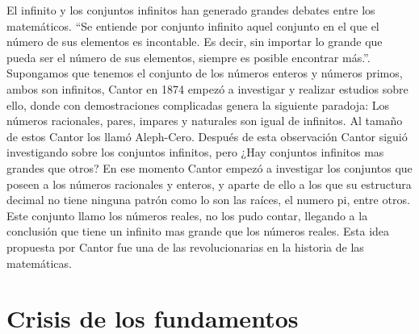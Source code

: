 \documentclass[11pt,letterpaper]{article}
\begin{document}
El infinito y los conjuntos infinitos han generado grandes debates entre los matemáticos. \cite{perez:Online}“Se entiende por conjunto infinito aquel conjunto en el que el número de sus elementos es incontable. Es decir, sin importar lo grande que pueda ser el número de sus elementos, siempre es posible encontrar más.”. Supongamos que tenemos el conjunto de los números enteros y números primos, ambos son infinitos, Cantor en 1874 empezó a investigar y realizar estudios sobre ello, donde con demostraciones complicadas genera la siguiente paradoja: Los números racionales, pares, impares y naturales son igual de infinitos. Al tamaño de estos Cantor los llamó Aleph-Cero.
Después de esta observación Cantor siguió investigando sobre los conjuntos infinitos, pero ¿Hay conjuntos infinitos mas grandes que otros? En ese momento Cantor empezó a investigar los conjuntos que poseen a los números racionales y enteros, y aparte de ello a los que su estructura decimal no tiene ninguna patrón como lo son las raíces, el numero pi, entre otros. Este conjunto llamo los números reales, no los pudo contar, llegando a la conclusión que tiene un infinito mas grande que los números reales. Esta idea propuesta por Cantor fue una de las revolucionarias en la historia de las matemáticas.




\section{Crisis de los fundamentos}
\end{document}
